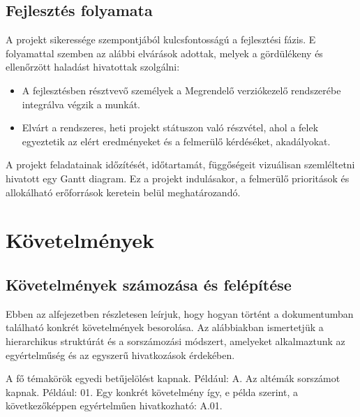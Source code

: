 \documentclass{scrreprt}
\begin{document}
\section{Fejlesztés folyamata}
A projekt sikeressége szempontjából kulcsfontosságú a fejlesztési fázis. E folyamattal szemben az alábbi elvárások adottak, melyek a gördülékeny és ellenőrzött
haladást hivatottak szolgálni:
\begin{itemize}
      \item A fejlesztésben résztvevő személyek a Megrendelő verziókezelő rendszerébe integrálva végzik a munkát.
      \item Elvárt a rendszeres, heti projekt státuszon való részvétel, ahol a felek egyeztetik az elért eredményeket és a felmerülő kérdéséket, akadályokat.
\end{itemize}
A projekt feladatainak időzítését, időtartamát, függőségeit vizuálisan szemléltetni hivatott egy Gantt diagram. Ez a projekt indulásakor, a felmerülő prioritások és allokálható erőforrások keretein belül meghatározandó.

\chapter{Követelmények}

\section{Követelmények számozása és felépítése}

Ebben az alfejezetben részletesen leírjuk, hogy hogyan történt a dokumentumban található konkrét követelmények besorolása. Az alábbiakban ismertetjük a
hierarchikus struktúrát és a sorszámozási módszert, amelyeket alkalmaztunk az egyértelműség és az egyszerű hivatkozások érdekében.

A fő témakörök egyedi betűjelölést kapnak. Például: A. Az altémák sorszámot kapnak. Például: 01. Egy konkrét követelmény így, e példa szerint, a
következőképpen egyértelműen hivatkozható: A.01.
\end{document}
